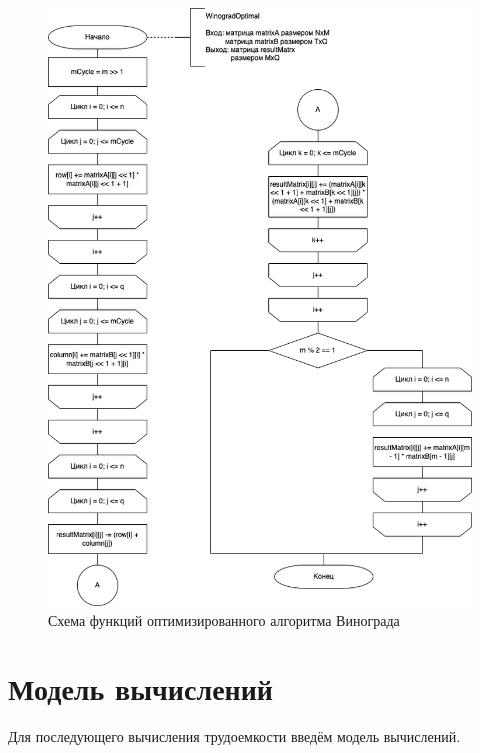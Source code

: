 \begin{figure}[ht!]
	\centering
	\includegraphics[scale=0.65]{img/WinogradOptimal.png}
	\caption{Схема функций оптимизированного алгоритма Винограда}
	\label{fig:mpr}
\end{figure}

\newpage

\section{Модель вычислений}

Для последующего вычисления трудоемкости введём модель вычислений.

